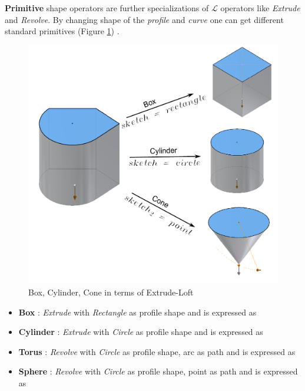 
{\bf Primitive} shape operators are further specializations of {\bf $\mathcal{L}$} operators like {\em Extrude} and {\em Revolve}. By changing shape of the {\em profile} and {\em curve} one can get different standard primitives  (Figure \ref{figure_ExtrudeBoxCylCone}) .

\begin{figure}[htbp]
	\includegraphics[scale=0.35]{../Common/images//ExtrudeBoxCylCone.pdf} 
\caption{Box, Cylinder, Cone in terms of Extrude-Loft}
\label{figure_ExtrudeBoxCylCone}
\end{figure}

\begin{itemize}[noitemsep,topsep=2pt,parsep=2pt,partopsep=2pt,label={},leftmargin=*]
\item {\bf Box} : {\em Extrude} with {\em Rectangle} as profile shape and is expressed as 	
\item {\bf Cylinder} : {\em Extrude} with {\em Circle} as profile shape and is expressed as 
\item {\bf Torus} : {\em Revolve} with {\em Circle} as profile shape, arc as path and is expressed as 	
\item {\bf Sphere} : {\em Revolve} with {\em Circle} as profile shape, point as path and is expressed as 	
\end{itemize}

